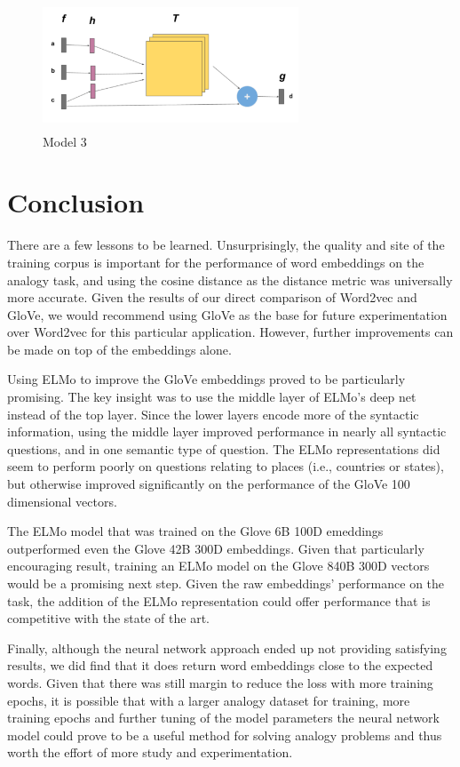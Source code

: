 \documentclass[11pt]{article}
\begin{document}
\begin{figure}
  \centering
\includegraphics[width=3.0in,height=1.5in]{./model_3.png}
  \caption{Model 3}
\end{figure}

\section{Conclusion}

There are a few lessons to be learned. Unsurprisingly, the quality and
site of the training corpus is important for the performance of word
embeddings on the analogy task, and using the cosine distance as the
distance metric was universally more accurate. Given the results of our
direct comparison of Word2vec and GloVe, we would recommend using GloVe
as the base for future experimentation over Word2vec for this particular
application. However, further improvements can be made on top of the
embeddings alone.

Using ELMo to improve the GloVe embeddings proved to be particularly
promising. The key insight was to use the middle layer of ELMo's deep
net instead of the top layer. Since the lower layers encode more of the
syntactic information, using the middle layer improved performance in
nearly all syntactic questions, and in one semantic type of question.
The ELMo representations did seem to perform poorly on questions
relating to places (i.e., countries or states), but otherwise improved
significantly on the performance of the GloVe 100 dimensional vectors.

The ELMo model that was trained on the Glove 6B 100D emeddings
outperformed even the Glove 42B 300D embeddings. Given that particularly
encouraging result, training an ELMo model on the Glove 840B 300D
vectors would be a promising next step. Given the raw embeddings'
performance on the task, the addition of the ELMo representation could
offer performance that is competitive with the state of the art.

Finally, although the neural network approach ended up not providing
satisfying results, we did find that it does return word embeddings
close to the expected words. Given that there was still margin to reduce
the loss with more training epochs, it is possible that with a larger
analogy dataset for training, more training epochs and further tuning of
the model parameters the neural network model could prove to be a useful
method for solving analogy problems and thus worth the effort of more
study and experimentation.
\end{document}
